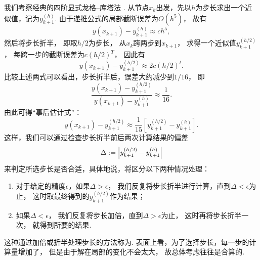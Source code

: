 我们考察经典的四阶显式龙格--库塔法 .
从节点\(x_k\)出发，先以\(h\)为步长求出一个近似值，记为\(y_{k+1}^{(h)}\).
由于递推公式的局部截断误差为\(O(h^5)\)，
故有\begin{equation*}
	y(x_{k+1})
	- y_{k+1}^{(h)}
	\approx c h^5,
\end{equation*}
然后将步长折半，
即取\(h/2\)为步长，
从\(x_k\)跨两步到\(x_{k+1}\)，
求得一个近似值\(y_{k+1}^{(h/2)}\)，
每跨一步的截断误差为\(c (h/2)^T\)，
因此有\begin{equation*}
	y(x_{k+1})
	- y_{k+1}^{(h/2)}
	\approx 2 c (h/2)^t.
\end{equation*}
比较上述两式可以看出，步长折半后，误差大约减少到\(1/16\)，
即\begin{equation*}
	\frac{
		y(x_{k+1})
		- y_{k+1}^{(h/2)}
	}{
		y(x_{k+1})
		- y_{k+1}^{(h)}
	}
	\approx
	\frac{1}{16}.
\end{equation*}
由此可得“事后估计式”：\begin{equation*}
	y(x_{k+1})
	- y_{k+1}^{(h/2)}
	\approx \frac{1}{15} \left[ y_{k+1}^{(h/2)} - y_{k+1}^{(h)} \right].
\end{equation*}
这样，我们可以通过检查步长折半前后两次计算结果的偏差\begin{equation*}
	\Delta := \abs{ y_{k+1}^{(h/2)} - y_{k+1}^{(h)} }
\end{equation*}
来判定所选步长是否合适，具体地说，将区分以下两种情况处理：
\begin{enumerate}
	\item 对于给定的精度\(\epsilon\)，如果\(\Delta > \epsilon\)，
	我们反复将步长折半进行计算，直到\(\Delta < \epsilon\)为止，
	这时取最终得到的\(y_{k+1}^{(h/2)}\)作为结果；
	\item 如果\(\Delta < \epsilon\)，
	我们反复将步长加倍，直到\(\Delta > \epsilon\)为止，
	这时再将步长折半一次，
	就得到所要的结果.
\end{enumerate}

这种通过加倍或折半处理步长的方法称为.
表面上看，为了选择步长，每一步的计算量增加了，
但是由于解在局部的变化不会太大，
故总体考虑往往是合算的.

